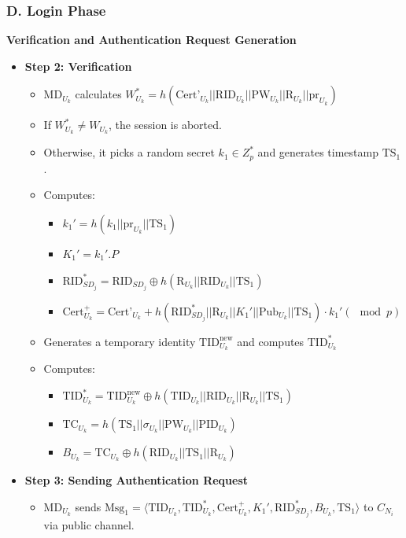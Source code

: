 \documentclass[9pt,handout]{beamer}
\begin{document}
\begin{frame}
    \frametitle{D. Login Phase}

    \textbf{Verification and Authentication Request Generation}

    \begin{itemize}
        \item \textbf{Step 2: Verification}
        \begin{itemize}
            \item \( \text{MD}_{U_k} \) calculates \( W^*_{U_k} = h(\text{Cert'}_{U_k} || \text{RID}_{U_k} || \text{PW}_{U_k} || \text{R}_{U_k} || \text{pr}_{U_k}) \)
            \item If \( W^*_{U_k} \neq W_{U_k} \), the session is aborted.
            \item Otherwise, it picks a random secret \( k_1 \in Z^*_p \) and generates timestamp \( \text{TS}_1 \).
            \item Computes:
            \begin{itemize}
                \item \( k_1' = h(k_1 || \text{pr}_{U_k} || \text{TS}_1) \)
                \item \( K_1' = k_1'.P \)
                \item \( \text{RID}^*_{SD_j} = \text{RID}_{SD_j} \oplus h(\text{R}_{U_k} || \text{RID}_{U_k} || \text{TS}_1) \)
                \item \( \text{Cert}^+_{U_k} = \text{Cert'}_{U_k} + h(\text{RID}^*_{SD_j} || \text{R}_{U_k} || K_1' || \text{Pub}_{U_k} || \text{TS}_1) \cdot k_1' (\mod p) \)
            \end{itemize}
            \item Generates a temporary identity \( \text{TID}_{U_k}^{\text{new}} \) and computes \( \text{TID}^*_{U_k} \)
            \item Computes:
            \begin{itemize}
                \item \( \text{TID}^*_{U_k} = \text{TID}_{U_k}^{\text{new}} \oplus h(\text{TID}_{U_k} || \text{RID}_{U_k} || \text{R}_{U_k} || \text{TS}_1) \)

                \item \( \text{TC}_{U_k} = h(\text{TS}_1 || \sigma_{U_k} || \text{PW}_{U_k} || \text{PID}_{U_k}) \)
                \item \( B_{U_k} = \text{TC}_{U_k} \oplus h(\text{RID}_{U_k} || \text{TS}_1 || \text{R}_{U_k}) \)
            \end{itemize}
        \end{itemize}

        \item \textbf{Step 3: Sending Authentication Request}
        \begin{itemize}
            \item \( \text{MD}_{U_k} \) sends \( \text{Msg}_1 = \langle \text{TID}_{U_k}, \text{TID}^*_{U_k}, \text{Cert}^+_{U_k}, K_1', \text{RID}^*_{SD_j}, B_{U_k}, \text{TS}_1 \rangle\)  to \( C_{N_i} \) via public channel.
        \end{itemize}
    \end{itemize}

\end{frame}
\end{document}

